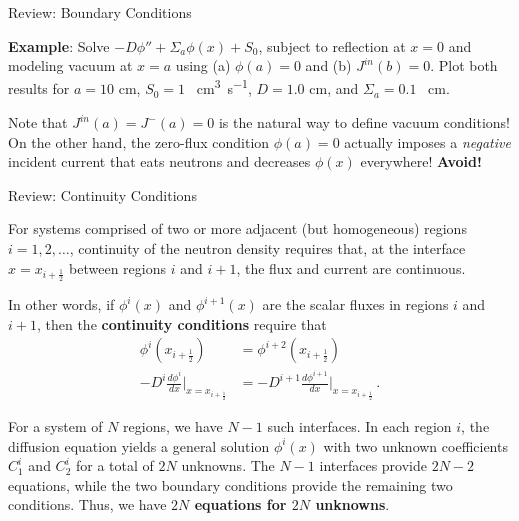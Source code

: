 \documentclass[aspectratio=1610]{beamer}
\begin{document}
\begin{frame}[fragile]{Review: Boundary Conditions}


{\small {\bf Example}: Solve $-D\phi'' + \Sigma_a \phi(x) + S_0$, subject to reflection at $x = 0$ and modeling vacuum at $x=a$ using (a) $\phi(a)=0$ and (b)  $J^{in}(b) = 0$. Plot both results for $a = 10$ cm, $S_0 = 1$ \si{\per\centi\meter\cubed\per\second}, $D = 1.0$ cm, and $\Sigma_a = 0.1$ \si{\per\centi\meter}.}


\begin{center}
\resizebox{0.7\textwidth}{!}{}
\end{center}


Note that $J^{in}(a) = J^-(a) = 0$ is the natural way to define vacuum conditions!  On the other hand, the zero-flux condition $\phi(a)=0$ actually imposes a {\it negative} incident current that eats neutrons and decreases $\phi(x)$ everywhere! {\bf Avoid!}


\end{frame}

\begin{frame}[fragile]{Review: Continuity Conditions}

For systems comprised of two or more adjacent (but homogeneous) regions $i=1, 2,\ldots $, 
continuity of the neutron density requires that, at the interface $x=x_{i+\frac{1}{2}}$ 
between regions $i$ and $i+1$, the flux and current are continuous. 

\vfill

In other words, if $\phi^{i}(x)$ and $\phi^{i+1}(x)$ are the scalar fluxes in 
regions $i$ and $i+1$, then the {\bf continuity conditions} require that
\begin{align*}
\tag{flux continuity}
 \phi^{i}(x_{i+\frac{1}{2}}) &= \phi^{i+2}(x_{i+\frac{1}{2}})  \\
\tag{current continuity}
 -D^{i} \frac{d\phi^{i}}{dx}\Big |_{x=x_{i+\frac{1}{2}}} &= -D^{i+1} \frac{d\phi^{i+1}}{dx}\Big |_{x=x_{i+\frac{1}{2}}}  \, .
\end{align*}

For a system of $N$ regions, we have $N-1$ such interfaces.  In each region $i$, the 
diffusion equation yields a general solution $\phi^{i}(x)$ with two unknown 
coefficients $C^i_1$ and $C^i_2$ for a total of $2N$ unknowns.  The $N-1$ interfaces
provide $2N-2$ equations, while the two boundary conditions provide the remaining
two conditions. Thus, we have {\bf $2N$ equations for $2N$ unknowns}.

\end{frame}
\end{document}
